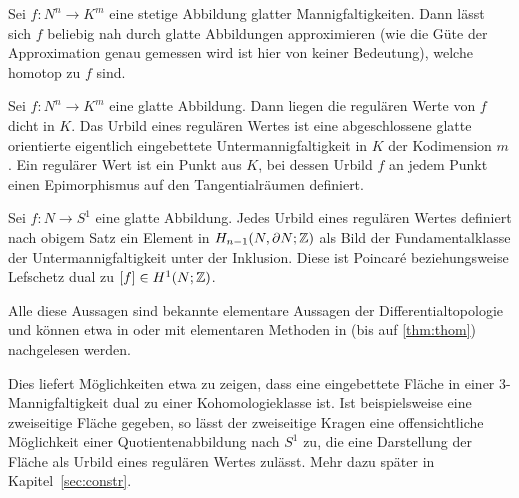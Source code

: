 	\begin{thm}
		Sei $f:N^n\to K^m$ eine stetige Abbildung glatter Mannigfaltigkeiten. Dann lässt sich $f$ beliebig nah durch glatte Abbildungen approximieren (wie die Güte der Approximation genau gemessen wird ist hier von keiner Bedeutung), welche homotop zu $f$ sind.
	\end{thm}
	\begin{thm}
		Sei $f:N^n \to K^m$ eine glatte Abbildung. Dann liegen die regulären Werte von $f$ dicht in $K$. Das Urbild eines regulären Wertes ist eine abgeschlossene glatte orientierte eigentlich eingebettete Untermannigfaltigkeit in $K$ der Kodimension $m$. Ein regulärer Wert ist ein Punkt aus $K$, bei dessen Urbild $f$ an jedem Punkt einen Epimorphismus auf den Tangentialräumen definiert. 
	\end{thm}
	\begin{thm}[Thom]
	\label{thm:thom}
		Sei $f:N \to S^1$ eine glatte Abbildung. Jedes Urbild eines regulären Wertes definiert nach obigem Satz ein Element in $H_{n-1}(N,\partial N;\mathbb{Z})$ als Bild der Fundamentalklasse der Untermannigfaltigkeit unter der Inklusion. Diese ist Poincaré beziehungsweise Lefschetz dual zu $[f]\in H^1(N;\mathbb{Z})$.
	\end{thm}
	Alle diese Aussagen sind bekannte elementare Aussagen der Differentialtopologie und können etwa in \cite{Kreck.2010} oder mit elementaren Methoden in \cite{Hirsch.1991} (bis auf \ref{thm:thom}) nachgelesen werden. 

	Dies liefert Möglichkeiten etwa zu zeigen, dass eine eingebettete Fläche in einer 3-Mannigfaltigkeit dual zu einer Kohomologieklasse ist. Ist beispielsweise eine zweiseitige Fläche gegeben, so lässt der zweiseitige Kragen eine offensichtliche Möglichkeit einer Quotientenabbildung nach $S^1$ zu, die eine Darstellung der Fläche als Urbild eines regulären Wertes zulässt. Mehr dazu später in Kapitel~\ref{sec:constr}.
	
